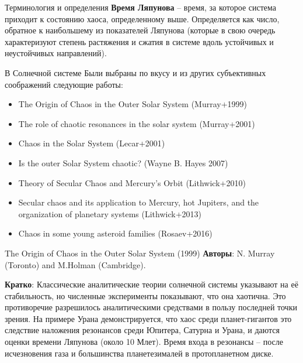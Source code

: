 \documentclass{beamer}
\begin{document}
\begin{frame}{Терминология и определения}
        \textbf{Время Ляпунова} -- время, за которое система приходит к состоянию хаоса, определенному выше. Определяется как число, обратное к наибольшему из показателей Ляпунова (которые в свою очередь характеризуют степень растяжения и сжатия в системе вдоль устойчивых и неустойчивых направлений).

\end{frame}


\begin{frame}{В Солнечной системе}
        Были выбраны по вкусу и из других субъективных соображений следующие работы:
        \begin{itemize}
                \item The Origin of Chaos in the Outer Solar System (Murray+1999)
                \item The role of chaotic resonances in the solar system (Murray+2001)
                \item Chaos in the Solar System (Lecar+2001)
                \item Is the outer Solar System chaotic? (Wayne B. Hayes 2007)
                \item Theory of Secular Chaos and Mercury's Orbit (Lithwick+2010)
                \item Secular chaos and its application to Mercury, hot Jupiters, and the organization of planetary systems (Lithwick+2013)
                \item Chaos in some young asteroid families (Rosaev+2016)
        \end{itemize}
\end{frame}




\begin{frame}{The Origin of Chaos in the Outer Solar System (1999)}
        \textbf{Авторы}: N. Murray (Toronto) and M.Holman (Cambridge).

        \textbf{Кратко}: Классические аналитические теории солнечной системы указывают на её стабильность, но численные эксперименты показывают, что она хаотична. Это противоречие разрешилось аналитическими средствами в пользу последней точки зрения. На примере Урана демонстрируется, что хаос среди планет-гигантов это следствие наложения резонансов среди Юпитера, Сатурна и Урана, и даются оценки времени Ляпунова (около 10 Млет). Время входа в резонансы -- после исчезновения газа и большинства планетезималей в протопланетном диске.
\end{frame}
\end{document}
